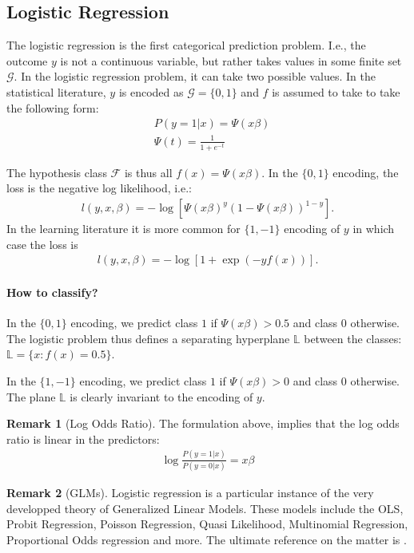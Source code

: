 \documentclass[12pt,a4paper]{article}
\theoremstyle{plain}
\theoremstyle{definition}
\newtheorem{remark}{Remark}
\newcommand{\loss}{l}
\newcommand{\hyp}{f}
\newcommand{\hypclass}{\mathcal{F}}
\newcommand{\plane}{\mathbb{L}}
\newcommand{\categories}{\mathcal{G}}
\begin{document}
\subsection{Logistic Regression}
\label{sec:logistic}
The logistic regression is the first categorical prediction problem. 
I.e., the outcome $y$ is not a continuous variable, but rather takes values in some finite set $\categories$. In the logistic regression problem, it can take two possible values.
In the statistical literature, $y$ is encoded as $\categories=\{0,1\}$ and $\hyp$ is assumed to take to take the following form:
\begin{align}
	& P(y=1|x) = \Psi(x\beta) \\
	& \Psi(t) = \frac{1}{1+e^{-t}}
\end{align}

The hypothesis class $\hypclass$ is thus all $\hyp(x)=\Psi(x\beta)$.
In the $\{0,1\}$ encoding, the loss is the negative log likelihood, i.e.:
\begin{align}
	\loss(y,x,\beta) = -\log \left[ \Psi(x\beta)^{y} (1-\Psi(x\beta))^{1-y}  \right].
\end{align}
In the learning literature it is more common for $\{1,-1\}$ encoding of $y$ in which case the loss is 
\begin{align}
	\loss(y,x,\beta) = -\log \left[ 1+\exp(-y f(x))  \right].
\end{align}


\paragraph{How to classify?}
In the $\{0,1\}$ encoding, we predict class $1$ if $\Psi(x\beta)>0.5$ and class $0$ otherwise.
The logistic problem thus defines a separating hyperplane $\plane$ between the classes: $\plane=\{x:f(x)=0.5\}$.

In the $\{1,-1\}$ encoding, we predict class $1$ if $\Psi(x\beta)>0$ and class $0$ otherwise.
The plane $\plane$ is clearly invariant to the encoding of $y$.


\begin{remark}[Log Odds Ratio]
The formulation above, implies that the log odds ratio is linear in the predictors:
\begin{align*}
	\log \frac{P(y=1|x)}{P(y=0|x)} = x\beta
\end{align*}
\end{remark}



\begin{remark}[GLMs]
Logistic regression is a particular instance of the very developped theory of Generalized Linear Models.
These models include the OLS, Probit Regression, Poisson Regression, Quasi Likelihood, Multinomial Regression, Proportional Odds regression and more.
The ultimate reference on the matter is \cite{mccullagh_generalized_1989}.
\end{remark}
\end{document}
